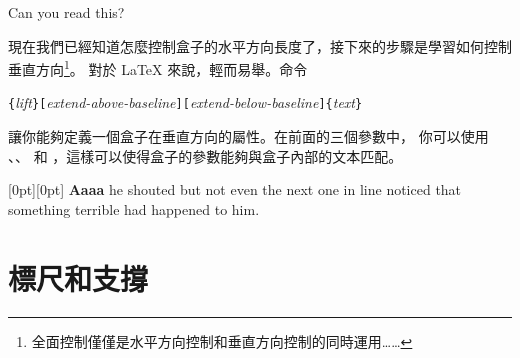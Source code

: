 \begin{example}
\par
{}\par
{} \par
{} \par
{}
Can you read this?
\end{example}

現在我們已經知道怎麼控制盒子的水平方向長度了，接下來的步驟是學習如何控制
垂直方向\footnote{全面控制僅僅是水平方向控制和垂直方向控制的同時運用……}。
對於 \LaTeX{} 來說，輕而易舉。命令

\begin{lscommand}
\verb|{|\emph{lift}\verb|}[|\emph{extend-above-baseline}\verb|][|\emph{extend-below-baseline}\verb|]{|\emph{text}\verb|}|
\end{lscommand}

\noindent 讓你能夠定義一個盒子在垂直方向的屬性。在前面的三個參數中，
你可以使用 、、 
和 ，這樣可以使得盒子的參數能夠與盒子內部的文本匹配。

\begin{example}
\raisebox{0pt}[0pt][0pt]{\Large%
\textbf{Aaaa\raisebox{-0.3ex}{a}%
\raisebox{-0.7ex}{aa}%
\raisebox{-1.2ex}{r}%
\raisebox{-2.2ex}{g}%
\raisebox{-4.5ex}{h}}}
he shouted but not even the next
one in line noticed that something
terrible had happened to him.
\end{example}


\section{標尺和支撐}
\label{sec:rule}


